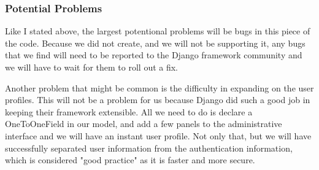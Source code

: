 \subsubsection{Potential Problems}

Like I stated above, the largest potentional problems will be bugs in this piece of the code.
Because we did not create, and we will not be supporting it, any bugs that we find will need to be reported to the Django framework community and we will have to wait for them to roll out a fix.

Another problem that might be common is the difficulty in expanding on the user profiles.
This will not be a problem for us because Django did such a good job in keeping their framework extensible.
All we need to do is declare a OneToOneField in our model, and add a few panels to the administrative interface and we will have an instant user profile.
Not only that, but we will have successfully separated user information from the authentication information, which is considered "good practice" as it is faster and more secure.